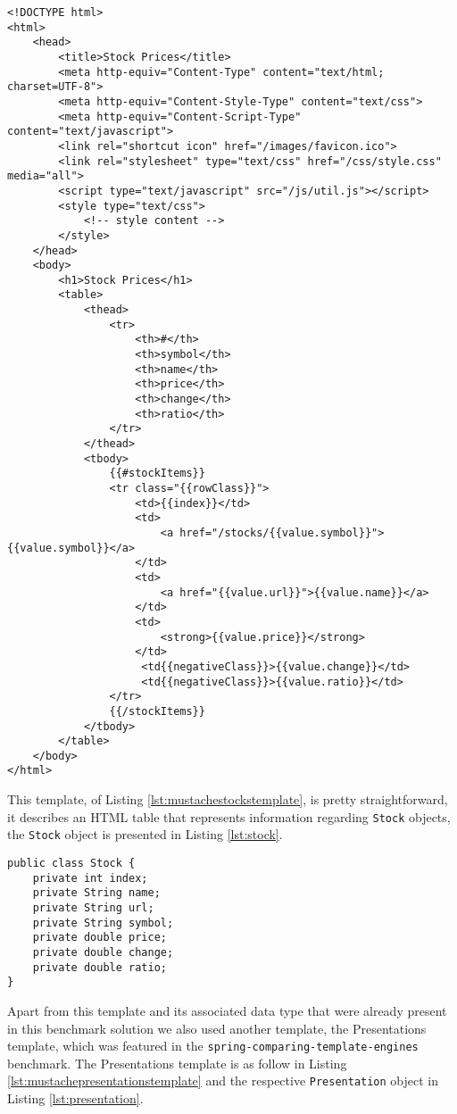 \begin{lstlisting}[caption={Stocks Template Defined in the Mustache Idiom},captionpos=b,label={lst:mustachestockstemplate}]
<!DOCTYPE html>
<html>
	<head>
		<title>Stock Prices</title>
		<meta http-equiv="Content-Type" content="text/html; charset=UTF-8">
		<meta http-equiv="Content-Style-Type" content="text/css">
		<meta http-equiv="Content-Script-Type" content="text/javascript">
		<link rel="shortcut icon" href="/images/favicon.ico">
		<link rel="stylesheet" type="text/css" href="/css/style.css" media="all">
		<script type="text/javascript" src="/js/util.js"></script>
		<style type="text/css">
			<!-- style content -->
		</style>
	</head>
	<body>
		<h1>Stock Prices</h1>
		<table>
			<thead>
	    		<tr>
	     			<th>#</th>
	     			<th>symbol</th>
	     			<th>name</th>
	     			<th>price</th>
	     			<th>change</th>
	     			<th>ratio</th>
	    		</tr>
	   		</thead>
	   		<tbody>
				{{#stockItems}}
	    		<tr class="{{rowClass}}">
	     			<td>{{index}}</td>
	    			<td>
	      				<a href="/stocks/{{value.symbol}}">{{value.symbol}}</a>
	     			</td>
	     			<td>
	      				<a href="{{value.url}}">{{value.name}}</a>
	     			</td>
	     			<td>
	      				<strong>{{value.price}}</strong>
	     			</td>
				     <td{{negativeClass}}>{{value.change}}</td>
				     <td{{negativeClass}}>{{value.ratio}}</td>
	    		</tr>
				{{/stockItems}}
	   		</tbody>
		</table>
	</body>
</html>
\end{lstlisting}

\noindent
This template, of Listing \ref{lst:mustachestockstemplate}, is pretty straightforward, it describes an \ac{HTML} table that represents information regarding \texttt{Stock} objects, the \texttt{Stock} object is presented in Listing \ref{lst:stock}.

\bigskip


\begin{minipage}{\linewidth}
\begin{lstlisting}[caption={Stocks Data Type},captionpos=b,label={lst:stock}]
public class Stock {
    private int index;
    private String name;
    private String url;
    private String symbol;
    private double price;
    private double change;
    private double ratio;    
}
\end{lstlisting}
\end{minipage}

\noindent
Apart from this template and its associated data type that were already present in this benchmark solution we also used another template, the Presentations template, which was featured in the \texttt{spring-comparing-template-engines} benchmark. The Presentations template is as follow in Listing \ref{lst:mustachepresentationstemplate} and the respective \texttt{Presentation} object in Listing \ref{lst:presentation}.

